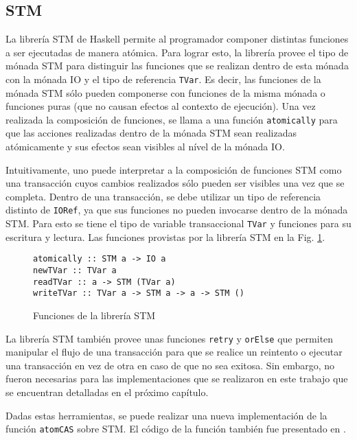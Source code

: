 \subsection{STM}\label{sub:stm}
La librería STM de Haskell permite al programador componer distintas funciones a ser ejecutadas de manera atómica.
Para lograr esto, la librería provee el tipo de mónada STM para distinguir las funciones que se realizan dentro de esta mónada con la mónada IO y el tipo de referencia \texttt{TVar}.
Es decir, las funciones de la mónada STM sólo pueden componerse con funciones de la misma mónada o funciones puras (que no causan efectos al contexto de ejecución). Una vez realizada la composición de funciones, se llama a una función \texttt{atomically} para que las acciones realizadas dentro de la mónada STM sean realizadas atómicamente y sus efectos sean visibles al nível de la mónada IO.

Intuitivamente, uno puede interpretar a la composición de funciones STM como una transacción cuyos cambios realizados sólo pueden ser visibles una vez que se completa.
Dentro de una transacción, se debe utilizar un tipo de referencia distinto de \texttt{IORef}, ya que sus funciones no pueden invocarse dentro de la mónada STM. Para esto se tiene el tipo de variable transaccional \texttt{TVar} y funciones para su escritura y lectura.
Las funciones provistas por la librería STM en la Fig. \ref{fig:stm-interface}.

\begin{figure}[t]
\begin{verbatim}
atomically :: STM a -> IO a
newTVar :: TVar a
readTVar :: a -> STM (TVar a)
writeTVar :: TVar a -> STM a -> a -> STM ()
\end{verbatim}
\caption{Funciones de la librería STM}
\label{fig:stm-interface}
\end{figure}

La librería STM también provee unas funciones \texttt{retry} y \texttt{orElse} que permiten manipular el flujo de una transacción para que se realice un reintento o ejecutar una transacción en vez de otra en caso de que no sea exitosa.
Sin embargo, no fueron necesarias para las implementaciones que se realizaron en este trabajo que se encuentran detalladas en el próximo capítulo.

Dadas estas herramientas, se puede realizar una nueva implementación de la función \texttt{atomCAS} sobre STM.
El código de la función también fue presentado en \cite{linked-list}.

